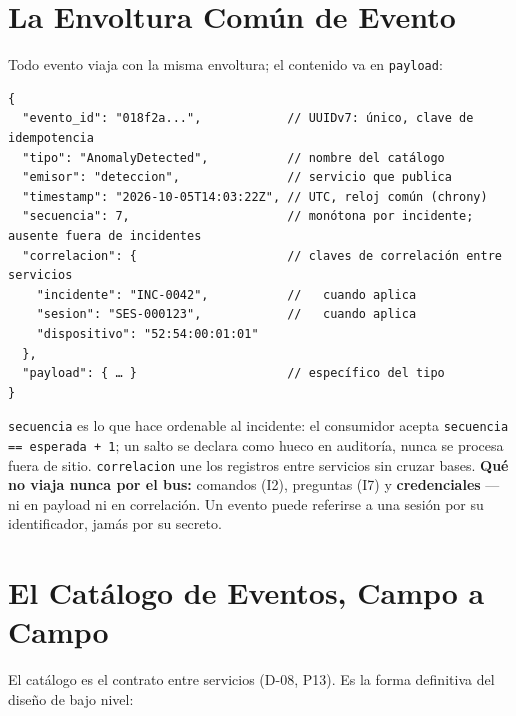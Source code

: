 \documentclass[11pt,a4paper]{report}
\begin{document}
\section{La Envoltura Común de Evento}
Todo evento viaja con la misma envoltura; el contenido va en \texttt{payload}:

\begin{verbatim}
{
  "evento_id": "018f2a...",            // UUIDv7: único, clave de idempotencia
  "tipo": "AnomalyDetected",           // nombre del catálogo
  "emisor": "deteccion",               // servicio que publica
  "timestamp": "2026-10-05T14:03:22Z", // UTC, reloj común (chrony)
  "secuencia": 7,                      // monótona por incidente; ausente fuera de incidentes
  "correlacion": {                     // claves de correlación entre servicios
    "incidente": "INC-0042",           //   cuando aplica
    "sesion": "SES-000123",            //   cuando aplica
    "dispositivo": "52:54:00:01:01"
  },
  "payload": { … }                     // específico del tipo
}
\end{verbatim}

\texttt{secuencia} es lo que hace ordenable al incidente: el consumidor acepta \texttt{secuencia == esperada + 1}; un salto se declara como hueco en auditoría, nunca se procesa fuera de sitio. \texttt{correlacion} une los registros entre servicios sin cruzar bases. \textbf{Qué no viaja nunca por el bus:} comandos (I2), preguntas (I7) y \textbf{credenciales} — ni en payload ni en correlación. Un evento puede referirse a una sesión por su identificador, jamás por su secreto.

\section{El Catálogo de Eventos, Campo a Campo}
El catálogo es el contrato entre servicios (D-08, P13). Es la forma definitiva del diseño de bajo nivel:
\end{document}
